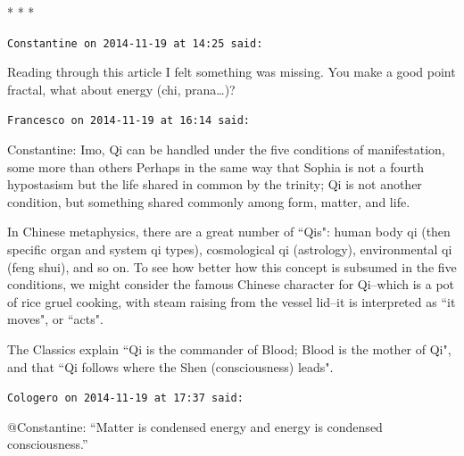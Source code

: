
\begin{center}* * *\end{center}

\begin{footnotesize}\begin{sffamily}



\texttt{Constantine on 2014-11-19 at 14:25 said: }

Reading through this article I felt something was missing. You make a good point fractal, what about energy (chi, prana…)?


\hfill

\texttt{Francesco on 2014-11-19 at 16:14 said: }

Constantine: Imo, Qi can be handled under the five conditions of manifestation, some more than others Perhaps in the same way that Sophia is not a fourth hypostasism but the life shared in common by the trinity; Qi is not another condition, but something shared commonly among form, matter, and life. 

In Chinese metaphysics, there are a great number of ``Qis": human body qi (then specific organ and system qi types), cosmological qi (astrology), environmental qi (feng shui), and so on. To see how better how this concept is subsumed in the five conditions, we might consider the famous Chinese character for Qi–which is a pot of rice gruel cooking, with steam raising from the vessel lid–it is interpreted as ``it moves", or ``acts".

The Classics explain ``Qi is the commander of Blood; Blood is the mother of Qi", and that ``Qi follows where the Shen (consciousness) leads".



\hfill

\texttt{Cologero on 2014-11-19 at 17:37 said: }

@Constantine: “Matter is condensed energy and energy is condensed consciousness.” 


\end{sffamily}\end{footnotesize}

